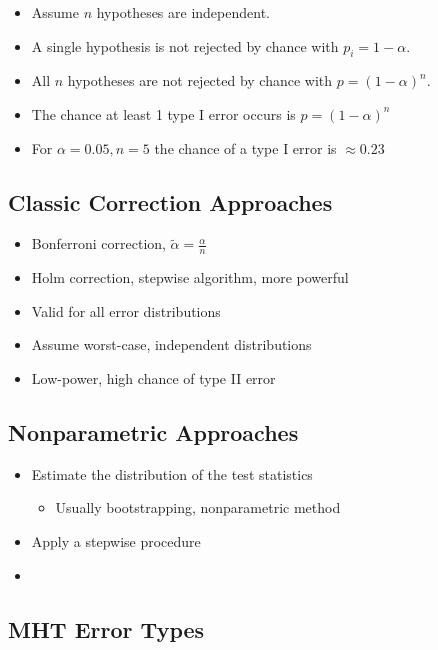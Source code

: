 \documentclass[10pt]{article}
\begin{document}
	\begin{itemize}
		\item Assume $n$ hypotheses are independent.
		\item A single hypothesis is not rejected by chance with $p_i = 1-\alpha$.
		\item All $n$ hypotheses are not rejected by chance with $p = (1-\alpha)^n$.
		\item The chance at least 1 type I error occurs is $p = (1-\alpha)^n$
		\item For $\alpha=0.05, n=5$ the chance of a type I error is $\approx 0.23$
	\end{itemize}

	\subsection[Classic Correction Approaches]{Classic Correction Approaches}

	\begin{itemize}
		\item Bonferroni correction, $\tilde{\alpha} = \frac{\alpha}{n}$
		\item Holm correction, stepwise algorithm, more powerful
		\item Valid for all error distributions
		\item Assume worst-case, independent distributions
		\item Low-power, high chance of type II error
	\end{itemize}

	\subsection[Nonparametric Approaches]{Nonparametric Approaches}

	\begin{itemize}
		\item Estimate the distribution of the test statistics
			\begin{itemize}
				\item Usually bootstrapping, nonparametric method 
			\end{itemize}
		\item Apply a stepwise procedure 
		\item \textcite{list_2019,white_2000,romano_2005}
	\end{itemize}

	\subsection[MHT Error Types]{MHT Error Types}
\end{document}
